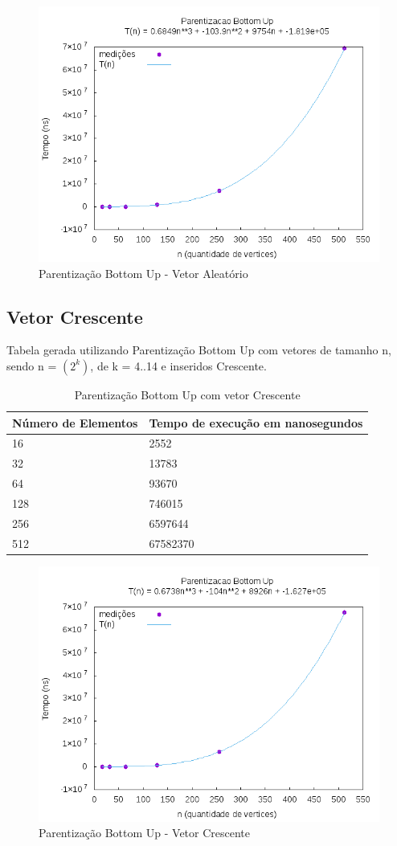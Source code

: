 \documentclass[12pt,a4paper,twoside]{report}
\begin{document}
\begin{figure}[H]
    \centering
    \includegraphics[width=0.7\linewidth]{graficos/Parentizacao BottomUp/Aleatorio/ParentizacaoBottomUp.png}
  \caption{Parentização Bottom Up - Vetor Aleatório}
\end{figure}



\subsection{Vetor Crescente}
Tabela gerada utilizando Parentização Bottom Up com vetores de tamanho n, sendo n = $(2^
k)$, de k = 4..14 e inseridos Crescente.
\begin{table}[H]
\centering
\caption{Parentização Bottom Up com vetor Crescente}
\label{my-label}
\begin{tabular}{|l|l|}
\hline
\multicolumn{1}{|c|}{\textbf{Número de Elementos}} & \multicolumn{1}{c|}{\textbf{Tempo de execução em nanosegundos}} \\ \hline
16 & 2552 \\ \hline
32 & 13783 \\ \hline
64 & 93670 \\ \hline
128 & 746015 \\ \hline
256 & 6597644 \\ \hline
512 & 67582370 \\ \hline
\end{tabular}
\end{table}

\begin{figure}[H]
    \centering
    \includegraphics[width=0.7\linewidth]{graficos/Parentizacao BottomUp/Crescente/ParentizacaoBottomUp.png}
  \caption{Parentização Bottom Up - Vetor Crescente}
\end{figure}
\end{document}
